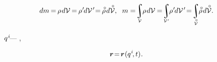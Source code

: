 \nopagebreak\vspace{-0.2em}\begin{equation}\label{balanceofmass}
dm \hspace{-0.15ex}
= \hspace{-0.2ex} \rho \hspace{.2ex} d\mathcal{V} \hspace{-0.2ex}
= \hspace{-0.2ex} \rho\hspace{.1ex}' \hspace{-0.2ex} d\mathcal{V}\hspace{.2ex}' \hspace{-0.5ex}
= \hspace{-0.2ex} \mathcircabove{\rho} \hspace{.22ex} d\mathcircabove{\mathcal{V}} ,
\hspace{.6em}
%
m = \hspace{-0.4ex} \scalebox{0.9}{$\displaystyle\integral\displaylimits_{\mathcal{V}}$} \hspace{-0.2ex} \rho \hspace{.2ex} d\mathcal{V} \hspace{-0.1ex}
= \hspace{-0.4ex} \scalebox{0.9}{$\displaystyle\integral\displaylimits_{\mathcal{V}\hspace{.12ex}'}$} \hspace{-0.2ex} \rho\hspace{.1ex}' \hspace{-0.2ex} d\mathcal{V}\hspace{.2ex}' \hspace{-0.4ex}
= \hspace{-0.4ex} \scalebox{0.9}{$\displaystyle\integral\displaylimits_{\mathcircabove{\mathcal{V}}}$} \hspace{-0.2ex} \mathcircabove{\rho} \hspace{.22ex} d\mathcircabove{\mathcal{V}} .
\vspace{-0.5em}\end{equation}

  ~${q^{\hspace{.1ex}i}\hspace{-0.3ex}}$\:--- ,  

\nopagebreak\vspace{-0.2em}\begin{equation}\label{particlelocationbycoordinatesandtime}
\bm{r} \hspace{-0.4ex} = \hspace{-0.3ex} \bm{r} \hspace{.1ex} (q^{\hspace{.1ex}i} \hspace{-0.33ex}, t)
\hspace{.1ex} .
\end{equation}

